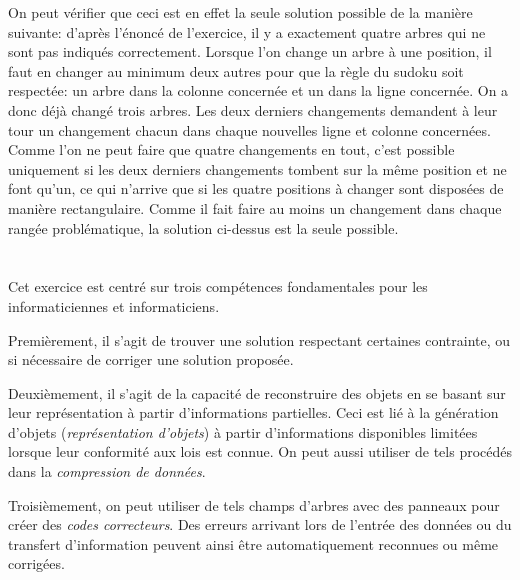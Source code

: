 {{On peut vérifier que ceci est en effet la seule solution possible de la manière suivante: d’après l’énoncé de l’exercice, il y a exactement quatre arbres qui ne sont pas indiqués correctement. Lorsque l’on change un arbre à une position, il faut en changer au minimum deux autres pour que la règle du sudoku soit respectée: un arbre dans la colonne concernée et un dans la ligne concernée. On a donc déjà changé trois arbres. Les deux derniers changements demandent à leur tour un changement chacun dans chaque nouvelles ligne et colonne concernées. Comme l’on ne peut faire que quatre changements en tout, c’est possible uniquement si les deux derniers changements tombent sur la même position et ne font qu’un, ce qui n’arrive que si les quatre positions à changer sont disposées de manière rectangulaire. Comme il fait faire au moins un changement dans chaque rangée problématique, la solution ci-dessus est la seule possible.



\section*{\BrochureItsInformatics}
Cet exercice est centré sur trois compétences fondamentales pour les informaticiennes et informaticiens.

Premièrement, il s’agit de trouver une solution respectant certaines contrainte, ou si nécessaire de corriger une solution proposée.

Deuxièmement, il s’agit de la capacité de reconstruire des objets en se basant sur leur représentation à partir d’informations partielles. Ceci est lié à la génération d’objets (\emph{représentation d’objets}) à partir d’informations disponibles limitées lorsque leur conformité aux lois est connue. On peut aussi utiliser de tels procédés dans la \emph{compression de données}.

Troisièmement, on peut utiliser de tels champs d’arbres avec des panneaux pour créer des \emph{codes correcteurs}. Des erreurs arrivant lors de l’entrée des données ou du transfert d’information peuvent ainsi être automatiquement reconnues ou même corrigées.



}}

